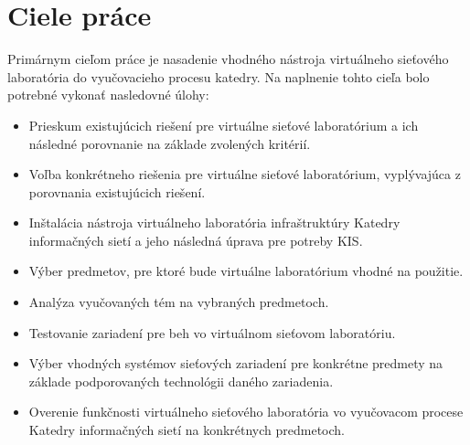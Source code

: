 \chapter{Ciele práce}

Primárnym cieľom práce je nasadenie vhodného nástroja virtuálneho sieťového laboratória do vyučovacieho procesu katedry. Na naplnenie tohto cieľa bolo potrebné vykonať nasledovné úlohy:

\begin{itemize}[noitemsep]
    \item Prieskum existujúcich riešení pre virtuálne sieťové laboratórium a ich následné porovnanie na základe zvolených kritérií.
    \item Voľba konkrétneho riešenia pre virtuálne sieťové laboratórium, vyplývajúca z porovnania existujúcich riešení.
    \item Inštalácia nástroja virtuálneho laboratória infraštruktúry Katedry informačných sietí a jeho následná úprava pre potreby KIS.
    \item Výber predmetov, pre ktoré bude virtuálne laboratórium vhodné na použitie.
    \item Analýza vyučovaných tém na vybraných predmetoch.
    \item Testovanie zariadení pre beh vo virtuálnom sieťovom laboratóriu.
    \item Výber vhodných systémov sieťových zariadení pre konkrétne predmety na základe podporovaných technológii daného zariadenia.
    \item Overenie funkčnosti virtuálneho sieťového laboratória vo vyučovacom procese Katedry informačných sietí na konkrétnych predmetoch.
\end{itemize}